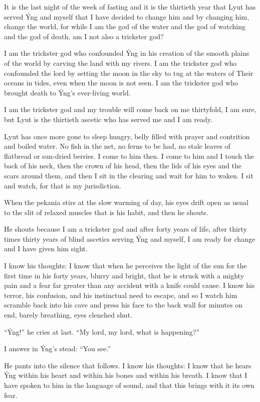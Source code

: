 \secdiv

\noindent It is the last night of the week of fasting and it is the thirtieth year that Lyut has served Ýng and myself that I have decided to change him and by changing him, change the world, for while I am the god of the water and the god of watching and the god of death, am I not also a trickster god?

I am the trickster god who confounded Ýng in his creation of the smooth plains of the world by carving the land with my rivers. I am the trickster god who confounded the lord by setting the moon in the sky to tug at the waters of Their oceans in tides, even when the moon is not seen. I am the trickster god who brought death to Ýng's ever-living world.

I am the trickster god and my trouble will come back on me thirtyfold, I am sure, but Lyut is the thirtieth ascetic who has served me and I am ready.

Lyut has once more gone to sleep hungry, belly filled with prayer and contrition and boiled water. No fish in the net, no ferns to be had, no stale leaves of flatbread or sun-dried berries. I come to him then. I come to him and I touch the back of his neck, then the crown of his head, then the lids of his eyes and the scars around them, and then I sit in the clearing and wait for him to waken. I sit and watch, for that is my jurisdiction.

When the pekania stirs at the slow warming of day, his eyes drift open as usual to the slit of relaxed muscles that is his habit, and then he shouts.

He shouts because I am a trickster god and after forty years of life, after thirty times thirty years of blind ascetics serving Ýng and myself, I am ready for change and I have given him sight.

I know his thoughts: I know that when he perceives the light of the sun for the first time in his forty years, blurry and bright, that he is struck with a mighty pain and a fear far greater than any accident with a knife could cause. I know his terror, his confusion, and his instinctual need to escape, and so I watch him scramble back into his cave and press his face to the back wall for minutes on end, barely breathing, eyes clenched shut.

``Ýng!'' he cries at last. ``My lord, my lord, what is happening?''

I answer in Ýng's stead: ``You see.''

He pants into the silence that follows. I know his thoughts: I know that he hears Ýng within his heart and within his bones and within his breath. I know that I have spoken to him in the language of sound, and that this brings with it its own fear.

